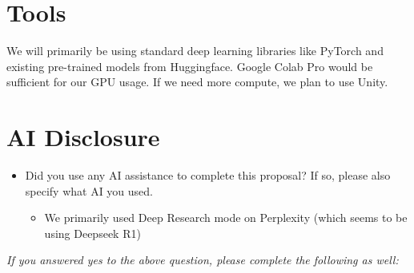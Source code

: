 \documentclass[11pt,a4paper]{article}
\begin{document}
\section{Tools}

We will primarily be using standard deep learning libraries like PyTorch and existing pre-trained models from Huggingface. Google Colab Pro would be sufficient for our GPU usage. If we need more compute, we plan to use Unity.


\section{AI Disclosure}
\begin{itemize}
    \item Did you use any AI assistance to complete this proposal? If so, please also specify what AI you used.
    \begin{itemize}
        \item We primarily used Deep Research mode on Perplexity (which seems to be using Deepseek R1)
    \end{itemize}
\end{itemize}

\noindent\textit{If you answered yes to the above question, please complete the following as well:}
\end{document}
